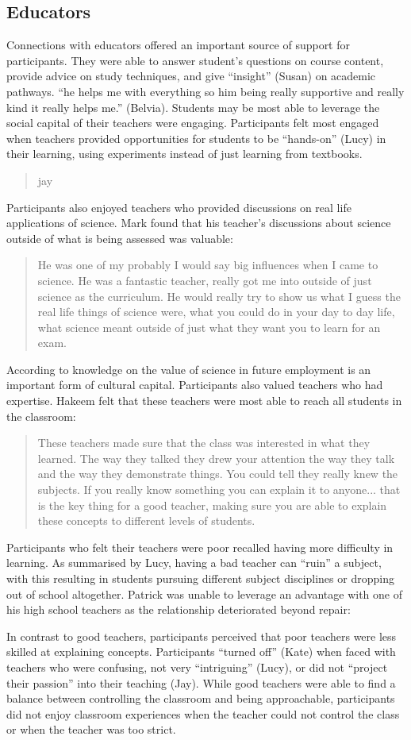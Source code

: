 \subsection{Educators}
Connections with educators offered an important source of support for participants. They were able to answer student's questions on course content, provide advice on study techniques, and give ``insight'' (Susan) on academic pathways. ``he helps me with everything so him being really supportive and really kind it really helps me.'' (Belvia). Students may be most able to leverage the social capital of their teachers were engaging. Participants felt most engaged when teachers provided opportunities for students to be ``hands-on'' (Lucy) in their learning, using experiments instead of just learning from textbooks. \blockquote{jay}.  Participants also enjoyed teachers who provided discussions on real life applications of science. Mark found that his teacher's discussions about science outside of what is being assessed was valuable: \blockquote{He was one of my probably I would say big influences when I came to science. He was a fantastic teacher, really got me into outside of just science as the curriculum. He would really try to show us what I guess the real life things of science were, what you could do in your day to day life, what science meant outside of just what they want you to learn for an exam.} According to \cite{Archer2015a} knowledge on the value of science in future employment is an important form of cultural capital. Participants also valued teachers who had expertise. Hakeem felt that these teachers were most able to reach all students in the classroom: \blockquote{These teachers made sure that the class was interested in what they learned. The way they talked they drew your attention the way they talk and the way they demonstrate things. You could tell they really knew the subjects. If you really know something you can explain it to anyone... that is the key thing for a good teacher, making sure you are able to explain these concepts to different levels of students.}

Participants who felt their teachers were poor recalled having more difficulty in learning.  As summarised by Lucy, having a bad teacher can ``ruin'' a subject, with this resulting in students pursuing different subject disciplines or dropping out of school altogether. Patrick was unable to leverage an advantage with one of his high school teachers as the relationship deteriorated beyond repair: \blockquote{} In contrast to good teachers, participants perceived that poor teachers were less skilled at explaining concepts. Participants ``turned off'' (Kate) when faced with teachers who were confusing, not very ``intriguing'' (Lucy), or did not ``project their passion'' into their teaching (Jay). While good teachers were able to find a balance between controlling the classroom and being approachable, participants did not enjoy classroom experiences when the teacher could not control the class or when the teacher was too strict. 

